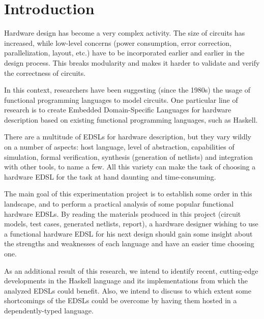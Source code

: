 \section{Introduction}
\label{sec:intro}

    Hardware design has become a very complex activity. The size of circuits has increased, while
    low-level concerns (power consumption, error correction, parallelization, layout, etc.) have to
    be incorporated earlier and earlier in the design process. This breaks modularity and makes it
    harder to validate and verify the correctness of circuits.

    In this context, researchers have been suggesting (since the 1980s) the usage of functional
    programming languages to model circuits. One particular line of research is to create Embedded
    Domain-Specific Languages for hardware description based on existing functional programming
    languages, such as Haskell.

    There are a multitude of EDSLs for hardware description, but they vary wildly on a number of
    aspects: host language, level of abstraction, capabilities of simulation, formal verification,
    synthesis (generation of netlists) and integration with other tools, to name a few. All this
    variety can make the task of choosing a hardware EDSL for the task at hand daunting and
    time-consuming.

    The main goal of this experimentation project is to establish some order in this landscape, and
    to perform a practical analysis of some popular functional hardware EDSLs. By reading the
    materials produced in this project (circuit models, test cases, generated netlists, report), a
    hardware designer wishing to use a functional hardware EDSL for his next design should gain some
    insight about the strengths and weaknesses of each language and have an easier time choosing
    one.

    As an additional result of this research, we intend to identify recent, cutting-edge
    developments in the Haskell language and its implementations from which the analyzed EDSLs could
    benefit. Also, we intend to discuss to which extent some shortcomings of the EDSLs could be
    overcome by having them hosted in a dependently-typed language.
